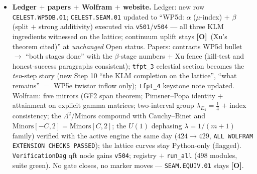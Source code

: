 \documentclass[11pt]{article}
\providecommand{\mO}{\textbf{[O]}}\providecommand{\mX}{\textbf{[X]}}
\begin{document}
\begin{itemize}[leftmargin=1.5em]
$\{\sigma_a\sigma_b\}$, $2.8\times10^{-14}$) --- the same ladder at doubled rate (Longo heredity,
\mC). \emph{Pimsner--Popa, exact}: $E(a)-a/2=PaP/2$ identically; attainment in integers (all
$16384$ (even, odd) monomial pairs at $N=8$: $8192$ extremal with $M^2=4$, $\operatorname{Tr}M=0$,
$PMP=-M$, $0$ violations; $2048/2048$ at $N=12$; pencil $\min\lambda=0.5000000000$);
$\lambda_{E_4}=\tfrac14=1/\mu$; index consistency $e^{\Delta_\infty}=2.000000000=
1/\lambda_{\mathrm{PP}}$ and $e^{2\Delta_\infty}=4=\mu$; $U(1)$: $\lambda=1/(m{+}1)\to0$.
\emph{Controls $+$ honesty}: dimerised phase trivial (drift $3.6\times10^{-15}$); wrong prescription
$\{1,P_{AB}\}$ deficit exactly $0$; $\Z_2$ finite-size honesty ($14.9\%$ below $\ln2$ at $N=4096$
--- witness, not proof). VERDICT: with \texttt{v501} all THREE KLM ingredients of complete
rationality are witnessed on the lattice; the continuum theorem for finite-group orbifolds is
\emph{Xu's} (cited, not claimed), the concrete seam quotient net and the condensed $(E_8)_1$ net
stay WP5e/Costello--Li.
\item \textbf{Ledger $+$ papers $+$ Wolfram $+$ website.} Ledger: new row \texttt{CELEST.WP5DB.01};
\texttt{CELEST.SEAM.01} updated to ``WP5d: $\alpha$ ($\mu$-index) $+$ $\beta$ (split $+$ strong
additivity) executed via \texttt{v501}/\texttt{v504} --- all three KLM ingredients witnessed on the
lattice; continuum uplift stays \mO\ (Xu's theorem cited)'' at \emph{unchanged} Open status. Papers:
contracts WP5d bullet $\to$ ``both stages done'' with the $\beta$-stage numbers $+$ Xu fence
(kill-test and honest-success paragraphs consistent); \texttt{tfpt\_3} celestial section becomes the
\emph{ten}-step story (new Step 10 ``the KLM completion on the lattice'', ``what remains'' $=$ WP5e
twistor inflow only); \texttt{tfpt\_4} keystone note updated. Wolfram: five mirrors (GF2 span
theorem; Pimsner--Popa identity $+$ attainment on explicit gamma matrices; two-interval group
$\lambda_{E_4}=\tfrac14$ $+$ index consistency; the $\Lambda^2$/Minors compound with Cauchy--Binet
and $\mathrm{Minors}[-C,2]=\mathrm{Minors}[C,2]$; the $U(1)$ dephasing $\lambda=1/(m{+}1)$ family)
verified with the active engine the same day ($424\to429$, \texttt{ALL WOLFRAM EXTENSION CHECKS
PASSED}); the lattice curves stay Python-only (flagged). \texttt{VerificationDag} qft node gains
\texttt{v504}; registry $+$ \texttt{run\_all} (498 modules, suite green). No gate closes, no marker
moves --- \texttt{SEAM.EQUIV.01} stays \mO.
\end{itemize}
\end{document}
